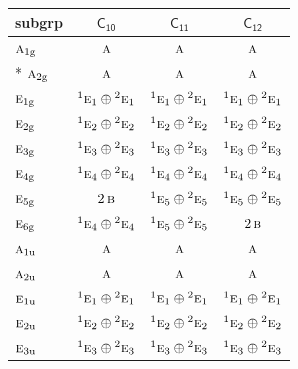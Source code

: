 \documentclass[10pt,a4paper]{article}
\numberwithin{equation}{section}
\newcommand{\grp}[1]{\mathsf{#1}}
\newcommand{\irr}[1]{\text{\normalfont\scshape #1}}
\newcommand{\conjpair}[1]{{}^{#1}}
\newcommand{\ptag}[1]{\mathrm{#1}}
\begin{document}
{\small\begin{longtable}{@{}lccc@{}}\toprule
subgrp & \href{C10.pdf}{$\grp{C_{10}}$} & \href{C11.pdf}{$\grp{C_{11}}$} & \href{C12.pdf}{$\grp{C_{12}}$}\\\midrule\endhead
\bottomrule\endfoot\endlastfoot
$\irr{a}_{1\ptag{g}}$ & $\irr{a}$ & $\irr{a}$ & $\irr{a}$\\*
$\irr{a}_{2\ptag{g}}$ & $\irr{a}$ & $\irr{a}$ & $\irr{a}$\\
$\irr{e}_{1\ptag{g}}$ & $\conjpair{1}\irr{e}_{1}\oplus \conjpair{2}\irr{e}_{1}$ & $\conjpair{1}\irr{e}_{1}\oplus \conjpair{2}\irr{e}_{1}$ & $\conjpair{1}\irr{e}_{1}\oplus \conjpair{2}\irr{e}_{1}$\\
$\irr{e}_{2\ptag{g}}$ & $\conjpair{1}\irr{e}_{2}\oplus \conjpair{2}\irr{e}_{2}$ & $\conjpair{1}\irr{e}_{2}\oplus \conjpair{2}\irr{e}_{2}$ & $\conjpair{1}\irr{e}_{2}\oplus \conjpair{2}\irr{e}_{2}$\\
$\irr{e}_{3\ptag{g}}$ & $\conjpair{1}\irr{e}_{3}\oplus \conjpair{2}\irr{e}_{3}$ & $\conjpair{1}\irr{e}_{3}\oplus \conjpair{2}\irr{e}_{3}$ & $\conjpair{1}\irr{e}_{3}\oplus \conjpair{2}\irr{e}_{3}$\\
$\irr{e}_{4\ptag{g}}$ & $\conjpair{1}\irr{e}_{4}\oplus \conjpair{2}\irr{e}_{4}$ & $\conjpair{1}\irr{e}_{4}\oplus \conjpair{2}\irr{e}_{4}$ & $\conjpair{1}\irr{e}_{4}\oplus \conjpair{2}\irr{e}_{4}$\\
$\irr{e}_{5\ptag{g}}$ & $2\,\irr{b}$ & $\conjpair{1}\irr{e}_{5}\oplus \conjpair{2}\irr{e}_{5}$ & $\conjpair{1}\irr{e}_{5}\oplus \conjpair{2}\irr{e}_{5}$\\
$\irr{e}_{6\ptag{g}}$ & $\conjpair{1}\irr{e}_{4}\oplus \conjpair{2}\irr{e}_{4}$ & $\conjpair{1}\irr{e}_{5}\oplus \conjpair{2}\irr{e}_{5}$ & $2\,\irr{b}$\\
$\irr{a}_{1\ptag{u}}$ & $\irr{a}$ & $\irr{a}$ & $\irr{a}$\\
$\irr{a}_{2\ptag{u}}$ & $\irr{a}$ & $\irr{a}$ & $\irr{a}$\\
$\irr{e}_{1\ptag{u}}$ & $\conjpair{1}\irr{e}_{1}\oplus \conjpair{2}\irr{e}_{1}$ & $\conjpair{1}\irr{e}_{1}\oplus \conjpair{2}\irr{e}_{1}$ & $\conjpair{1}\irr{e}_{1}\oplus \conjpair{2}\irr{e}_{1}$\\
$\irr{e}_{2\ptag{u}}$ & $\conjpair{1}\irr{e}_{2}\oplus \conjpair{2}\irr{e}_{2}$ & $\conjpair{1}\irr{e}_{2}\oplus \conjpair{2}\irr{e}_{2}$ & $\conjpair{1}\irr{e}_{2}\oplus \conjpair{2}\irr{e}_{2}$\\
$\irr{e}_{3\ptag{u}}$ & $\conjpair{1}\irr{e}_{3}\oplus \conjpair{2}\irr{e}_{3}$ & $\conjpair{1}\irr{e}_{3}\oplus \conjpair{2}\irr{e}_{3}$ & $\conjpair{1}\irr{e}_{3}\oplus \conjpair{2}\irr{e}_{3}$\\

\end{longtable}}
\end{document}
